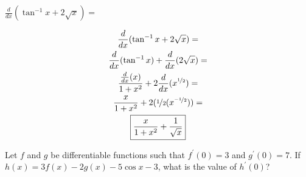 \documentclass[12pt,letterpaper, onecolumn]{exam}
\begin{document}
\begin{questions}

\pagebreak

\question $\frac{d}{dx} ( \tan^{-1} x + 2 \sqrt{x} ) = $	


    \begin{solution}
          \begin{gather*}
		\frac{d}{dx} ( \tan^{-1} x + 2 \sqrt{x} )  = \\ 
		\frac{d}{dx} ( \tan^{-1} x ) + \frac{d}{dx} ( 2 \sqrt{x} ) = \\
		\frac{\frac{d}{dx}(x)}{1+x^2} + 2 \frac{d}{dx} ( x^{\nicefrac{1}{2}} ) = \\
		\frac{x}{1+x^2} + 2 (\nicefrac{1}{2}(x^{\nicefrac{-1}{2}})) = \\
		\boxed{\frac{x}{1+x^2} + \frac{1}{\sqrt{x}}}
	\end{gather*}
    \end{solution}
    

\pagebreak

\question Let $f$ and $g$ be differentiable functions such that $f^\prime(0)=3$ and $g^\prime (0) = 7$. If $h(x)=3f(x)-2g(x)-5\cos x -3$, what is the value of $h^\prime(0)$?


\end{questions}
\end{document}

